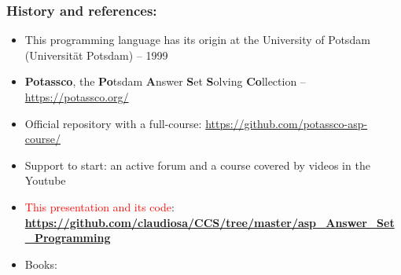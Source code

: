 \documentclass{beamer}
\begin{document}
\begin{frame}%

\frametitle{History and references:}

\begin{block}{}
  \begin{itemize}
   \item This programming language has its origin at the University of Potsdam (Universität Potsdam) -- 1999
   
   \item  \textbf{Potassco}, the \textbf{Po}tsdam \textbf{A}nswer \textbf{S}et \textbf{S}olving \textbf{Co}llection -- \url{https://potassco.org/}
   
   \item Official repository with a full-course: \url{https://github.com/potassco-asp-course/}

  \item Support to start: an active forum and a course covered by videos in the Youtube
  
  \item \textcolor{red}{This presentation and its code}:\\
   \textbf{\textcolor{blue}{\url{https://github.com/claudiosa/CCS/tree/master/asp_Answer_Set_Programming}}}
  
  \item Books: 

 \end{itemize}
  
\end{block}

\end{frame}


\end{document}
